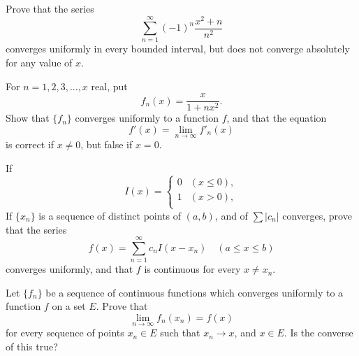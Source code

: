 \begin{myExercise}
    \label{ex:7.6}
    Prove that the series 
    \begin{equation*}
        \sum_{n=1}^{\infty} (-1)^n \frac{x^2+n}{n^2}
    \end{equation*}
    converges uniformly in every bounded interval, but does not converge absolutely for any value of $x$.
\end{myExercise}


\begin{myExercise}
    \label{ex:7.7}
    For $n=1,2,3,...,x$ real, put 
    \begin{equation*}
        f_n(x) = \frac{x}{1+nx^2}.
    \end{equation*}
    Show that $\{f_n\}$ converges uniformly to a function $f$, and that the equation
    \begin{equation*}
        f'(x) = \lim_{n \to \infty} f'_n(x)
    \end{equation*}
    is correct if $x \neq 0$, but false if $x=0$.
\end{myExercise}


\begin{myExercise}
    \label{ex:7.8}
    If 
    \begin{equation*}
        I(x) = \left\{ 
            \begin{array}{ll}
                0 & (x \leq 0), \\
                1 & (x >    0), \\
            \end{array}
         \right.
    \end{equation*}
    If $\{x_n\}$ is a sequence of distinct points of $(a,b)$, and of $\sum |c_n|$ converges, prove that the series 
    \begin{equation*}
        f(x) = \sum_{n=1}^{\infty} c_n I(x-x_n) \quad 
        (a \leq x \leq b)
    \end{equation*}
    converges uniformly, and that $f$ is continuous for every $x \neq x_n$.
\end{myExercise}


\begin{myExercise}
    \label{ex:7.9}
    Let $\{f_n\}$ be a sequence of continuous functions which converges uniformly to a function $f$ on a set $E$.
    Prove that 
    \begin{equation*}
        \lim_{n \to \infty} f_n (x_n) = f(x)
    \end{equation*}
    for every sequence of points $x_n \in E$ such that $x_n \rightarrow x$, and $x \in E$.
    Is the converse of this true?
\end{myExercise}


